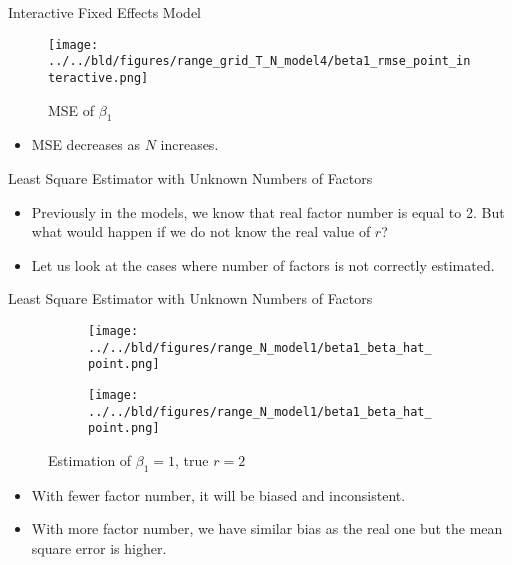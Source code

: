 \documentclass{beamer}
\begin{document}
\begin{frame}{Interactive Fixed Effects Model}

\begin{figure}

\texttt{[image: ../../bld/figures/range\_grid\_T\_N\_model4/beta1\_rmse\_point\_interactive.png]}
\centering
\caption{MSE of $\beta_1$}
\end{figure}

\begin{itemize}

    \item MSE decreases as $N$ increases.
\end{itemize}

\end{frame}

\begin{frame}{Least Square Estimator with Unknown Numbers of Factors}
\begin{itemize}
    \item Previously in the models, we know that real factor number is equal to 2. But what would happen if we do not know the real value of $r$?
    \item Let us look at the cases where number of factors is not correctly estimated.
\end{itemize}

\end{frame}

\begin{frame}{Least Square Estimator with Unknown Numbers of Factors}

\begin{figure}
\begin{subfigure}{.5\textwidth}
\centering
\texttt{[image: ../../bld/figures/range\_N\_model1/beta1\_beta\_hat\_point.png]}
\end{subfigure}%
\begin{subfigure}{.5\textwidth}
\centering
\texttt{[image: ../../bld/figures/range\_N\_model1/beta1\_beta\_hat\_point.png]}
\end{subfigure}%
\centering
\caption{Estimation of $\beta_1=1$, true $r=2$}
\end{figure}

\begin{itemize}
    \item With fewer factor number, it will be biased and inconsistent.
    \item With more factor number, we have similar bias as the real one but the mean square error is higher.
\end{itemize}

\end{frame}
\end{document}
